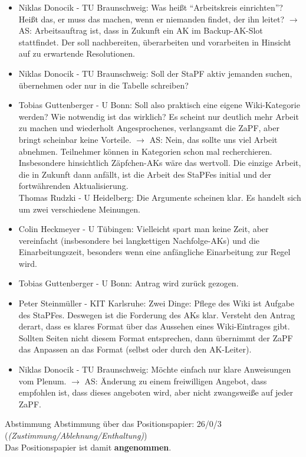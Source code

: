     \begin{itemize}
      \item Niklas Donocik - TU Braunschweig:  Was heißt ``Arbeitskreis einrichten''? Heißt das, er muss das machen, wenn er niemanden findet, der ihn leitet?
        $\rightarrow$ AS: Arbeitsauftrag ist, dass in Zukunft ein AK im Backup-AK-Slot stattfindet. Der soll nachbereiten, überarbeiten und vorarbeiten in Hinsicht auf zu erwartende Resolutionen.
      \item Niklas Donocik - TU Braunschweig:  Soll der StaPF aktiv jemanden suchen, übernehmen oder nur in die Tabelle schreiben?
      \item Tobias Guttenberger - U Bonn:  Soll also praktisch eine eigene Wiki-Kategorie werden? Wie notwendig ist das wirklich? Es scheint nur deutlich mehr Arbeit zu machen und wiederholt Angesprochenes, verlangsamt die ZaPF, aber bringt scheinbar keine Vorteile.
        $\rightarrow$ AS: Nein, das sollte uns viel Arbeit abnehmen. Teilnehmer können in Kategorien schon mal recherchieren.
      Insbesondere hinsichtlich Zäpfchen-AKs wäre das wertvoll. Die einzige Arbeit, die in Zukunft dann anfällt, ist die Arbeit des StaPFes initial und der fortwährenden Aktualisierung. \\
        Thomas Rudzki - U Heidelberg:  Die Argumente scheinen klar. Es handelt sich um zwei verschiedene Meinungen.
      \item Colin Heckmeyer - U Tübingen:  Vielleicht spart man keine Zeit, aber vereinfacht (insbesondere bei langkettigen Nachfolge-AKs) und  die Einarbeitungszeit, besonders wenn eine anfängliche Einarbeitung zur Regel wird.
      \item Tobias Guttenberger - U Bonn:  Antrag wird zurück gezogen.
      \item Peter Steinmüller - KIT Karlsruhe:  Zwei Dinge: Pflege des Wiki ist Aufgabe des StaPFes. Deswegen ist die Forderung des AKs klar.
      Versteht den Antrag derart, dass es klares Format über das Aussehen eines Wiki-Eintrages gibt. Sollten Seiten nicht diesem Format entsprechen, dann übernimmt der ZaPF das Anpassen an das Format (selbst oder durch den AK-Leiter).
      \item Niklas Donocik - TU Braunschweig:  Möchte einfach nur klare Anweisungen vom Plenum.
        $\rightarrow$ AS: Änderung zu einem freiwilligen Angebot, dass empfohlen ist, dass dieses angeboten wird, aber nicht zwangsweiße auf jeder ZaPF.
    \end{itemize}

    \begin{success}{Abstimmung}
      Abstimmung über das Positionspapier: 26/0/3 (\textit{(Zustimmung/Ablehnung/Enthaltung)}) \\
      Das Positionspapier ist damit \textbf{angenommen}.
    \end{success}

